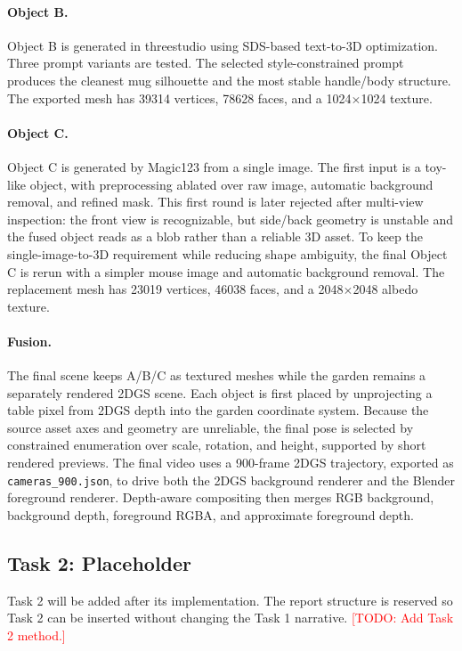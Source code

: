 \documentclass[10pt,twocolumn,letterpaper]{article}
\newcommand{\todo}[1]{\textcolor{red}{[TODO: #1]}}
\begin{document}
\paragraph{Object B.}
Object B is generated in threestudio using SDS-based text-to-3D optimization.
Three prompt variants are tested.
The selected style-constrained prompt produces the cleanest mug silhouette and the most stable handle/body structure.
The exported mesh has 39314 vertices, 78628 faces, and a 1024$\times$1024 texture.

\paragraph{Object C.}
Object C is generated by Magic123 from a single image.
The first input is a toy-like object, with preprocessing ablated over raw image, automatic background removal, and refined mask.
This first round is later rejected after multi-view inspection: the front view is recognizable, but side/back geometry is unstable and the fused object reads as a blob rather than a reliable 3D asset.
To keep the single-image-to-3D requirement while reducing shape ambiguity, the final Object C is rerun with a simpler mouse image and automatic background removal.
The replacement mesh has 23019 vertices, 46038 faces, and a 2048$\times$2048 albedo texture.

\paragraph{Fusion.}
The final scene keeps A/B/C as textured meshes while the garden remains a separately rendered 2DGS scene.
Each object is first placed by unprojecting a table pixel from 2DGS depth into the garden coordinate system.
Because the source asset axes and geometry are unreliable, the final pose is selected by constrained enumeration over scale, rotation, and height, supported by short rendered previews.
The final video uses a 900-frame 2DGS trajectory, exported as \texttt{cameras\_900.json}, to drive both the 2DGS background renderer and the Blender foreground renderer.
Depth-aware compositing then merges RGB background, background depth, foreground RGBA, and approximate foreground depth.

\subsection{Task 2: Placeholder}
Task 2 will be added after its implementation.
The report structure is reserved so Task 2 can be inserted without changing the Task 1 narrative.
\todo{Add Task 2 method.}
\end{document}
